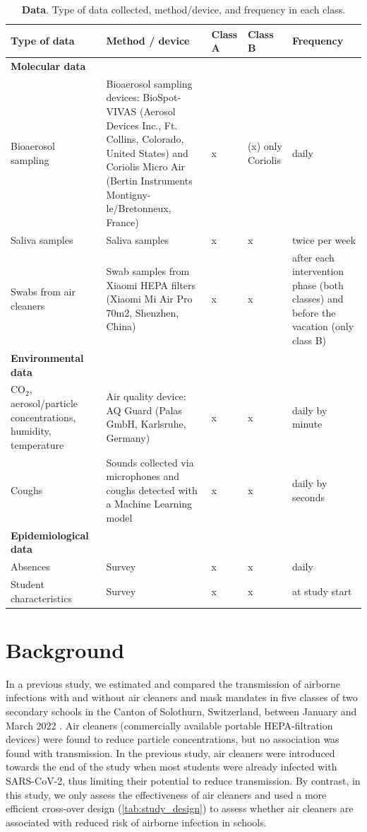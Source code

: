 \documentclass{article}
\begin{document}
\begin{table}[!htpb]
    \footnotesize
    \centering
    \caption{\textbf{Data}. Type of data collected, method/device, and frequency in each class.}
    \begin{tabular}{p{3.5cm}p{6cm} p{1cm} p{1cm} p{3cm}}
    \midrule
    Type of data & Method / device & Class A & Class B & Frequency \\
    \midrule
    \textbf{Molecular data} \\
    \midrule
    Bioaerosol sampling & Bioaerosol sampling devices: BioSpot-VIVAS (Aerosol Devices Inc., Ft. Collins, Colorado, United States) and Coriolis Micro Air (Bertin Instruments Montigny-le/Bretonneux, France) & x & (x) \newline only Coriolis & daily \\
    Saliva samples & Saliva samples & x & x & twice per week \\
    Swabs from air cleaners & Swab samples from Xiaomi HEPA filters (Xiaomi Mi Air Pro 70m2, Shenzhen, China) & x & x & after each intervention phase (both classes) and before the vacation (only class B) \\ 
    \midrule
    \textbf{Environmental data} \\
    \midrule
    CO$_2$, aerosol/particle concentrations, humidity, temperature & Air quality device: AQ Guard (Palas GmbH, Karlsruhe, Germany) & x & x & daily by minute \\
    Coughs & Sounds collected via microphones and coughs detected with a Machine Learning model \cite{Bertschinger2023CBMS} & x & x & daily by seconds \\
    \midrule
    \textbf{Epidemiological data} \\
    \midrule
    Absences & Survey & x & x & daily \\
    Student characteristics & Survey & x & x & at study start \\
    \bottomrule
    \end{tabular}
    \label{tab:data}
\end{table}

\section{Background}

In a previous study, we estimated and compared the transmission of airborne infections with and without air cleaners and mask mandates in five classes of two secondary schools in the Canton of Solothurn, Switzerland, between January and March 2022 \cite{Banholzer2023PLoSMed}. Air cleaners (commercially available portable HEPA-filtration devices) were found to reduce particle concentrations, but no association was found with transmission. In the previous study, air cleaners were introduced towards the end of the study when most students were already infected with SARS-CoV-2, thus limiting their potential to reduce transmission. By contrast, in this study, we only assess the effectiveness of air cleaners and used a more efficient cross-over design (\cref{tab:study_design}) to assess whether air cleaners are associated with reduced risk of airborne infection in schools.
\end{document}
